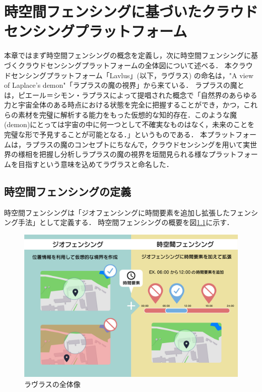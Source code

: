 \chapter{時空間フェンシングに基づいたクラウドセンシングプラットフォーム}
\thispagestyle{myheadings}
本章ではまず時空間フェンシングの概念を定義し，次に時空間フェンシングに基づくクラウドセンシングプラットフォームの全体図について述べる．
本クラウドセンシングプラットフォーム「Lavlus」(以下，ラヴラス) の命名は，"A view of Laplace's demon"「ラプラスの魔の視界」から来ている．
ラプラスの魔とは，ピエール＝シモン・ラプラスによって提唱された概念で「自然界のあらゆる力と宇宙全体のある時点における状態を完全に把握することができ，かつ，これらの素材を完璧に解析する能力をもった仮想的な知的存在．このような魔(demon)にとっては宇宙の中に何一つとして不確実なものはなく，未来のことを完璧な形で予見することが可能となる．」\cite{ziten}というものである．
本プラットフォームは，ラプラスの魔のコンセプトにちなんで，クラウドセンシングを用いて実世界の様相を把握し分析しラプラスの魔の視界を垣間見られる様なプラットフォームを目指すという意味を込めてラヴラスと命名した．

\section{時空間フェンシングの定義}
\label{STF}
時空間フェンシングは「ジオフェンシングに時間要素を追加し拡張したフェンシング手法」として定義する．
時空間フェンシングの概要を図\ref{fig:STF}に示す．

\begin{figure}[tbh]
    \centering
    \includegraphics[width=16cm]{img_STF.png}
    \caption{ラヴラスの全体像}
    \label{fig:STF}
\end{figure}

